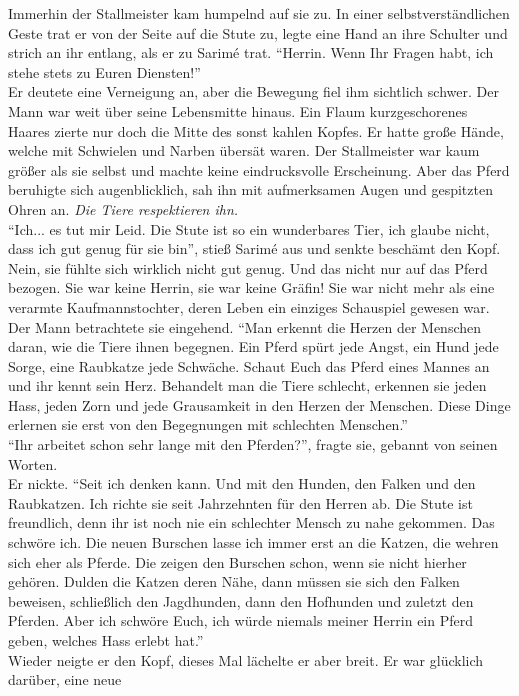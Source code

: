 Immerhin der Stallmeister kam humpelnd auf sie zu. In einer selbstverständlichen Geste trat er von 
der Seite auf die Stute zu, legte eine Hand an ihre Schulter und strich an ihr entlang, als er zu 
Sarimé trat. ``Herrin. Wenn Ihr Fragen habt, ich stehe stets zu Euren Diensten!''\\
Er deutete eine Verneigung an, aber die Bewegung fiel ihm sichtlich schwer. Der Mann war weit über 
seine Lebensmitte hinaus. Ein Flaum kurzgeschorenes Haares zierte nur doch die Mitte des sonst 
kahlen Kopfes. Er hatte große Hände, welche mit Schwielen und Narben übersät waren. Der 
Stallmeister war kaum größer als sie selbst und machte keine eindrucksvolle Erscheinung. Aber das 
Pferd beruhigte sich augenblicklich, sah ihn mit aufmerksamen Augen und gespitzten Ohren an.
\textit{Die Tiere respektieren ihn.}\\
``Ich... es tut mir Leid. Die Stute ist so ein wunderbares Tier, ich glaube nicht, dass ich gut 
genug für sie bin'', stieß Sarimé aus und senkte beschämt den Kopf. Nein, sie fühlte sich wirklich 
nicht gut genug. Und das nicht nur auf das Pferd bezogen. Sie war keine Herrin, sie war keine 
Gräfin! Sie war nicht mehr als eine verarmte Kaufmannstochter, deren Leben ein einziges Schauspiel 
gewesen war. Der Mann betrachtete sie eingehend. ``Man erkennt die Herzen der Menschen daran, wie 
die Tiere ihnen begegnen. Ein Pferd spürt jede Angst, ein Hund jede Sorge, eine Raubkatze jede 
Schwäche. Schaut Euch das Pferd eines Mannes an und ihr kennt sein Herz. Behandelt man die Tiere 
schlecht, erkennen sie jeden Hass, jeden Zorn und jede Grausamkeit in den Herzen der Menschen. Diese 
Dinge erlernen sie erst von den Begegnungen mit schlechten Menschen.''\\
``Ihr arbeitet schon sehr lange mit den Pferden?'', fragte sie, gebannt von seinen Worten.\\
Er nickte. ``Seit ich denken kann. Und mit den Hunden, den Falken und den Raubkatzen. Ich richte 
sie seit Jahrzehnten für den Herren ab. Die Stute ist freundlich, denn ihr ist noch nie ein 
schlechter Mensch zu nahe gekommen. Das schwöre ich. Die neuen Burschen lasse ich immer erst an die 
Katzen, die wehren sich eher als Pferde. Die zeigen den Burschen schon, wenn sie nicht hierher 
gehören. Dulden die Katzen deren Nähe, dann müssen sie sich den Falken beweisen, schließlich den 
Jagdhunden, dann den Hofhunden und zuletzt den Pferden. Aber ich schwöre Euch, ich würde niemals 
meiner Herrin ein Pferd geben, welches Hass erlebt hat.''\\
Wieder neigte er den Kopf, dieses Mal lächelte er aber breit. Er war glücklich darüber, eine neue 
